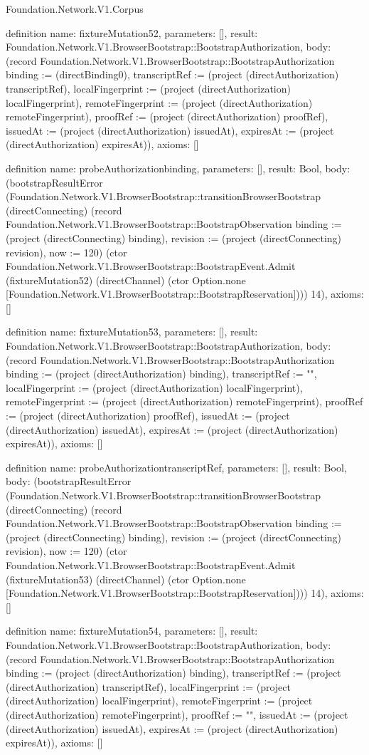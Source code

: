 \begin{lexlean}{Foundation.Network.V1.Corpus}
\begin{semanticmodule}
definition{
  name: fixtureMutation52,
  parameters: [],
  result: Foundation.Network.V1.BrowserBootstrap::BootstrapAuthorization,
  body: (record Foundation.Network.V1.BrowserBootstrap::BootstrapAuthorization {binding := (directBinding0), transcriptRef := (project (directAuthorization) transcriptRef), localFingerprint := (project (directAuthorization) localFingerprint), remoteFingerprint := (project (directAuthorization) remoteFingerprint), proofRef := (project (directAuthorization) proofRef), issuedAt := (project (directAuthorization) issuedAt), expiresAt := (project (directAuthorization) expiresAt)}),
  axioms: []
}

definition{
  name: probeAuthorizationbinding,
  parameters: [],
  result: Bool,
  body: (bootstrapResultError (Foundation.Network.V1.BrowserBootstrap::transitionBrowserBootstrap (directConnecting) (record Foundation.Network.V1.BrowserBootstrap::BootstrapObservation {binding := (project (directConnecting) binding), revision := (project (directConnecting) revision), now := 120}) (ctor Foundation.Network.V1.BrowserBootstrap::BootstrapEvent.Admit (fixtureMutation52) (directChannel) (ctor Option.none [Foundation.Network.V1.BrowserBootstrap::BootstrapReservation]))) 14),
  axioms: []
}

definition{
  name: fixtureMutation53,
  parameters: [],
  result: Foundation.Network.V1.BrowserBootstrap::BootstrapAuthorization,
  body: (record Foundation.Network.V1.BrowserBootstrap::BootstrapAuthorization {binding := (project (directAuthorization) binding), transcriptRef := "", localFingerprint := (project (directAuthorization) localFingerprint), remoteFingerprint := (project (directAuthorization) remoteFingerprint), proofRef := (project (directAuthorization) proofRef), issuedAt := (project (directAuthorization) issuedAt), expiresAt := (project (directAuthorization) expiresAt)}),
  axioms: []
}

definition{
  name: probeAuthorizationtranscriptRef,
  parameters: [],
  result: Bool,
  body: (bootstrapResultError (Foundation.Network.V1.BrowserBootstrap::transitionBrowserBootstrap (directConnecting) (record Foundation.Network.V1.BrowserBootstrap::BootstrapObservation {binding := (project (directConnecting) binding), revision := (project (directConnecting) revision), now := 120}) (ctor Foundation.Network.V1.BrowserBootstrap::BootstrapEvent.Admit (fixtureMutation53) (directChannel) (ctor Option.none [Foundation.Network.V1.BrowserBootstrap::BootstrapReservation]))) 14),
  axioms: []
}

definition{
  name: fixtureMutation54,
  parameters: [],
  result: Foundation.Network.V1.BrowserBootstrap::BootstrapAuthorization,
  body: (record Foundation.Network.V1.BrowserBootstrap::BootstrapAuthorization {binding := (project (directAuthorization) binding), transcriptRef := (project (directAuthorization) transcriptRef), localFingerprint := (project (directAuthorization) localFingerprint), remoteFingerprint := (project (directAuthorization) remoteFingerprint), proofRef := "", issuedAt := (project (directAuthorization) issuedAt), expiresAt := (project (directAuthorization) expiresAt)}),
  axioms: []
}


\end{semanticmodule}
\end{lexlean}
